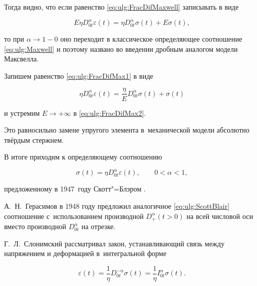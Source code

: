 Тогда видно, что если равенство  \eqref{eq:ulg:FracDifMaxwell} записывать в виде

\begin{equation}\label{eq:ulg:FracDifMax1}

E\eta D^{\alpha}_{0t}\varepsilon(t)=\eta D^{\alpha}_{0t}\sigma(t)+E\sigma(t),

\end{equation}

то при $\alpha\to 1-0$ оно переходит в классическое определяющее соотношение \eqref{eq:ulg:Maxwell} и поэтому названо во введении дробным аналогом модели Максвелла. 



Запишем равенство \eqref{eq:ulg:FracDifMax1} в  виде

\begin{equation}\label{eq:ulg:FracDifMax2}

\eta D^{\alpha}_{0t}\varepsilon(t)=\frac{\eta}{E} D^{\alpha}_{0t}\sigma(t)+\sigma(t)

\end{equation}

и устремим $E\to+\infty$ в \eqref{eq:ulg:FracDifMax2}. 

Это равносильно замене упругого элемента в~механической модели абсолютно твёрдым стержнем. 

В итоге приходим к определяющему соотношению

\begin{equation}\label{eq:ulg:ScottBlair}

\sigma(t)=\eta D^{\alpha}_{0t}\varepsilon(t),  \qquad 0<\alpha<1,

\end{equation}

предложенному в 1947~году Скотт"=Блэром \cite{ulg:bib:ScottBlair1947,ulg:bib:ScottBlair1949}.  

А.~Н.~Герасимов в 1948 году \cite{ulg:bib:Gerasimov1948} предложил аналогичное \eqref{eq:ulg:ScottBlair} соотношение с~использованием производной $D^{\alpha}_{+} (t>0)$ на всей числовой оси~\cite{ulg:bib:K-S-T,ulg:bib:S-K-M} вместо производной $D^{\alpha}_{0t}$ на отрезке.

Г.~Л.~Слонимский \cite{ulg:bib:Slonimsky} рассматривал закон, устанавливающий связь между напряжением и деформацией в~интегральной форме

\begin{equation}\label{eq:ulg:Slonimsky}

\varepsilon(t)=\frac{1}{\eta}D^{-\alpha}_{0t}\sigma(t)=\frac{1}{\eta}I^{\alpha}_{0t}\sigma(t).

\end{equation}



